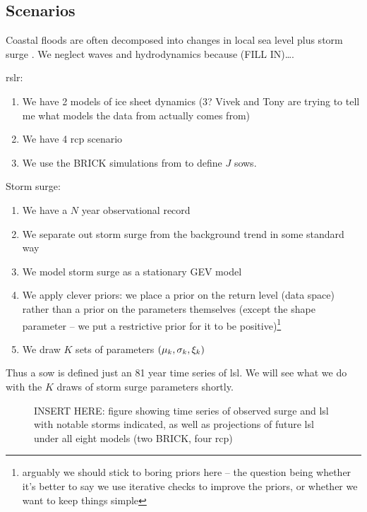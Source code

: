 \documentclass[12pt]{article}
\begin{document}
\subsection{Scenarios}

Coastal floods are often decomposed into changes in local sea level \citep{kopp_evolving:2017,kopp_probabilistic:2014,wong_brick0.2:2017} plus storm surge \citep{garner_slrise:2018,cagigal_emulator:2020,rueda_surge:2016}.
We neglect waves and hydrodynamics because (FILL IN)\ldots.

\gls{rslr}:
\begin{enumerate}
    \item We have 2 models of ice sheet dynamics (3? Vivek and Tony are trying to tell me what models the data from \citet{ruckert_coastal:2019} actually comes from)
    \item We have 4 \gls{rcp} scenario
    \item We use the BRICK \citep{wong_brick0.2:2017} simulations from \citet{ruckert_coastal:2019} to define $J$ \glspl{sow}.
\end{enumerate}
Storm surge:
\begin{enumerate}
    \item We have a $N$ year observational record
    \item We separate out storm surge from the background trend in some standard way
    \item We model storm surge as a stationary GEV model
    \item We apply clever priors: we place a prior on the return level (data space) rather than a prior on the parameters themselves (except the shape parameter -- we put a restrictive prior for it to be positive)\footnote{arguably we should stick to boring priors here -- the question being whether it's better to say we use iterative checks to improve the priors, or whether we want to keep things simple}
    \item We draw $K$ sets of parameters $\qty(\mu_k, \sigma_k, \xi_k)$
\end{enumerate}
Thus a \gls{sow} is defined just an 81 year time series of \gls{lsl}.
We will see what we do with the $K$ draws of storm surge parameters shortly.
\begin{figure}
    \caption{
        INSERT HERE: figure showing time series of observed surge and \gls{lsl} with notable storms indicated, as well as projections of future \gls{lsl} under all eight models (two BRICK, four \gls{rcp})
    }
\end{figure}
\end{document}
